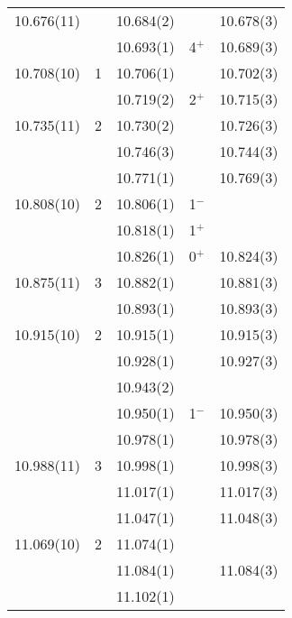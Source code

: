 \begin{center}
\begin{longtable}{cc cc c}
     10.676(11)   &   & 10.684(2)   &                               &    10.678(3)  \\
  &   & 10.693(1)   &            4$^+$              &    10.689(3)  \\
     10.708(10)   & 1 & 10.706(1)   &                               &    10.702(3)  \\
  &   & 10.719(2)   &            2$^+$              &    10.715(3)  \\
     10.735(11)   & 2 & 10.730(2)   &                               &    10.726(3)  \\
  &   & 10.746(3)   &                               &    10.744(3)  \\
  &   & 10.771(1)   &                               &    10.769(3)  \\
     10.808(10)   & 2 & 10.806(1)   &            1$^-$              &               \\
  &   & 10.818(1)   &            1$^+$              &               \\
  &   & 10.826(1)   &            0$^+$              &    10.824(3)  \\
     10.875(11)   & 3 & 10.882(1)   &                               &    10.881(3)  \\
  &   & 10.893(1)   &                               &    10.893(3)  \\
     10.915(10)   & 2 & 10.915(1)   &                               &    10.915(3)  \\
  &   & 10.928(1)   &                               &    10.927(3)  \\
  &   & 10.943(2)   &                               &               \\
  &   & 10.950(1)   &            1$^-$              &    10.950(3)  \\
  &   & 10.978(1)   &                               &    10.978(3)  \\
   10.988(11)     & 3 & 10.998(1)   &                               &    10.998(3)  \\
  &   & 11.017(1)   &                               &    11.017(3)  \\
  &   & 11.047(1)   &                               &    11.048(3)  \\
    11.069(10)    & 2 & 11.074(1)   &                               &               \\
  &   & 11.084(1)   &                               &    11.084(3)  \\
  &   & 11.102(1)   &                               &               \\

\end{longtable}
\end{center}
